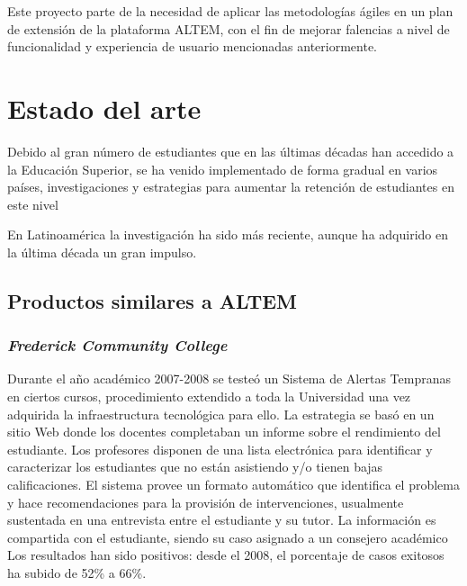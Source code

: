 Este proyecto parte de la necesidad de aplicar las metodologías ágiles en un plan de extensión de la plataforma ALTEM, con el fin de mejorar falencias a nivel de funcionalidad y experiencia de usuario mencionadas anteriormente.

\section{Estado del arte}
 Debido al gran número de estudiantes que en las últimas décadas han accedido a la Educación Superior, se ha venido implementado de forma gradual en varios países, investigaciones y estrategias para aumentar la retención de estudiantes en este nivel\cite{garinsallan}

 En Latinoamérica la investigación ha sido más reciente, aunque ha adquirido en la última década un gran impulso.\cite{SATPaper}

\subsection{Productos similares a ALTEM}

 \subsubsection{\textit{Frederick Community College}}
 Durante el año académico 2007-2008 se testeó un Sistema de Alertas Tempranas en ciertos cursos, procedimiento extendido a toda la Universidad una vez adquirida la infraestructura tecnológica para ello. La estrategia se basó en un sitio Web donde los docentes completaban un informe sobre el rendimiento del estudiante. Los profesores disponen de una lista electrónica para identificar y caracterizar los estudiantes que no están asistiendo y/o tienen bajas calificaciones. El sistema provee un formato automático que identifica el problema y hace recomendaciones para la provisión de intervenciones, usualmente sustentada en una entrevista entre el estudiante y su tutor. La información es compartida con el estudiante, siendo su caso asignado a un consejero académico \cite{chapellc} 
 Los resultados han sido positivos: desde el 2008, el porcentaje de casos exitosos ha subido de 52\% a 66\%.
 
